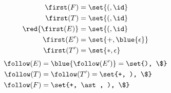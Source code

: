 \begin{frame}{}
  \begin{center}
    \begin{columns}
        
    \end{columns}

    \begin{columns}
        \begin{align*}
          \first(F) &= \set{(, \id} \\
          \first(T) &= \set{(, \id} \\
          \red{\first(E)} &= \set{(, \id} \\
          \first(E') &= \set{+, \blue{\epsilon}} \\
          \first(T') &= \set{\ast, \epsilon}
        \end{align*}
        \begin{align*}
          \follow(E) &= \blue{\follow(E')} = \set{), \$} \\
          \follow(T) &= \follow(T') = \set{+, ), \$} \\
          \follow(F) &= \set{+, \ast, ), \$}
        \end{align*}
    \end{columns}
  \end{center}
\end{frame}

\begin{frame}{}
  \begin{center}

  \end{center}
\end{frame}
